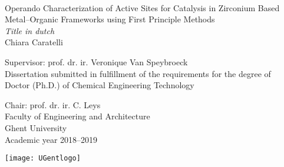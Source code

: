 \documentclass[10pt,twoside]{book}
\begin{document}


% 
 \thispagestyle{empty}   %
% 
\graphicspath{{figures/}}


\newpage\null\thispagestyle{empty}
\newpage\null\thispagestyle{empty}\newpage
\thispagestyle{empty}
% 


{\large \ \vspace{0.25\textheight} \\

\hspace{-\parindent} Operando Characterization of Active Sites for Catalysis in Zirconium Based Metal--Organic Frameworks using First Principle Methods\\

\hspace{-\parindent} \textit{Title in dutch} \\


\vspace{0.5cm}
\hspace{-\parindent}Chiara Caratelli}

\vspace*{\fill}
\hspace{-\parindent}Supervisor: prof. dr. ir.  Veronique Van Speybroeck \\
\hspace{-\parindent}Dissertation submitted in fulfillment of the requirements
 for the degree of\\
\hspace{-\parindent}Doctor (Ph.D.) of Chemical Engineering Technology\\



\vspace{0.5cm}

 \hspace{-\parindent}\begin{minipage}{0.7\textwidth}
 \hspace{-\parindent}Chair: prof. dr. ir. C. Leys \\
  \hspace{-\parindent}Faculty of Engineering and Architecture\\
  \hspace{-\parindent}Ghent University\\
  \hspace{-\parindent}Academic year 2018--2019
\end{minipage}
\begin{minipage}{0.3\textwidth}
  \begin{flushright}
    \texttt{[image: UGentlogo]}
  \end{flushright}
\end{minipage}
\end{document}

